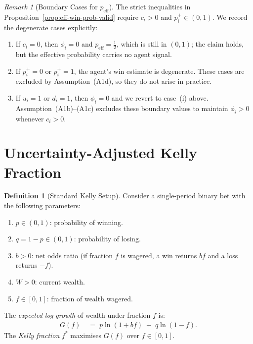 \documentclass[12pt,openany]{book}
\numberwithin{equation}{chapter}
\theoremstyle{plain}
\theoremstyle{definition}
\newtheorem{definition}[theorem]{Definition}
\theoremstyle{remark}
\newtheorem{remark}[theorem]{Remark}
\numberwithin{equation}{chapter}
\theoremstyle{plain}
\begin{document}
\begin{remark}[Boundary Cases for $p_{\mathrm{eff}}$]
\label{rem:peff-boundary}
The strict inequalities in
Proposition~\ref{prop:eff-win-prob-valid} require $c_i > 0$
and $p_i^+ \in (0,1)$.  We record the degenerate cases
explicitly:
\begin{enumerate}
  \item[\textup{(i)}] If $c_i = 0$, then $\phi_i = 0$ and
        $p_{\mathrm{eff}} = \tfrac{1}{2}$, which is still in
        $(0,1)$; the claim holds, but the effective probability
        carries no agent signal.
  \item[\textup{(ii)}] If $p_i^+ = 0$ or $p_i^+ = 1$, the
        agent's win estimate is degenerate.  These cases are
        excluded by Assumption~\textup{(A1d)}, so they do not
        arise in practice.
  \item[\textup{(iii)}] If $u_i = 1$ or $d_i = 1$, then
        $\phi_i = 0$ and we revert to case~(i) above.
        Assumption~\textup{(A1b)}--\textup{(A1c)} excludes
        these boundary values to maintain $\phi_i > 0$
        whenever $c_i > 0$.
\end{enumerate}
\end{remark}

\section{Uncertainty-Adjusted Kelly Fraction}

\begin{definition}[Standard Kelly Setup]
\label{def:kelly-setup}
Consider a single-period binary bet with the following parameters:
\begin{enumerate}
  \item[\textup{(i)}] $p \in (0,1)$: probability of winning.
  \item[\textup{(ii)}] $q = 1 - p \in (0,1)$: probability of
        losing.
  \item[\textup{(iii)}] $b > 0$: net odds ratio (if fraction $f$
        is wagered, a win returns $bf$ and a loss returns $-f$).
  \item[\textup{(iv)}] $W > 0$: current wealth.
  \item[\textup{(v)}] $f \in [0,1]$: fraction of wealth wagered.
\end{enumerate}
The \emph{expected log-growth} of wealth under fraction $f$ is:
\begin{align}
  G(f)
  &\;=\; p \ln(1 + bf) \;+\; q \ln(1 - f).
  \label{eq:kelly-logG}
\end{align}
The \emph{Kelly fraction} $f^*$ maximises $G(f)$ over
$f \in [0,1]$.
\end{definition}
\end{document}
